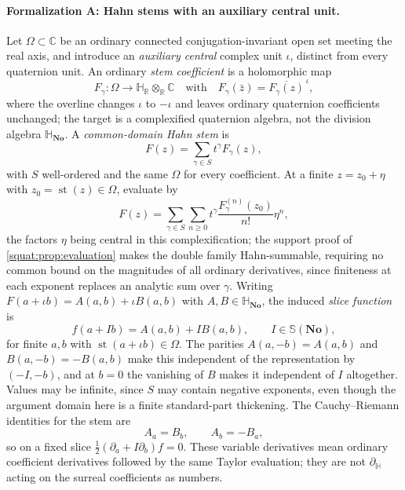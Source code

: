 \documentclass[11pt,letterpaper]{article}
\numberwithin{equation}{section}
\theoremstyle{definition}
\theoremstyle{remark}
\newcommand{\No}{\mathbf{No}}
\newcommand{\SQ}{\mathbb H_{\No}}
\newcommand{\HR}{\mathbb H_{\mathbb R}}
\newcommand{\R}{\mathbb R}
\newcommand{\C}{\mathbb C}
\newcommand{\st}{\operatorname{st}}
\newcommand{\dH}{\partial_{\mathbb H}}
\begin{document}
\paragraph{Formalization A: Hahn stems with an auxiliary central unit.}
Let $\Omega\subset\C$ be an ordinary connected conjugation-invariant open set meeting the
real axis, and introduce an \emph{auxiliary central} complex unit $\iota$, distinct from
every quaternion unit. An ordinary \emph{stem coefficient} is a holomorphic map
\[
 F_\gamma:\Omega\to\HR\otimes_\R\C\quad\text{with}\quad
 F_\gamma(\bar z)=\overline{F_\gamma(z)}^{\,\iota},
\]
where the overline changes $\iota$ to $-\iota$ and leaves ordinary quaternion coefficients
unchanged; the target is a complexified quaternion algebra, not the division algebra
$\SQ$. A \emph{common-domain Hahn stem} is
\begin{equation}\label{squat:eq:hahnstem}
 F(z)=\sum_{\gamma\in S}t^\gamma F_\gamma(z),
\end{equation}
with $S$ well-ordered and the same $\Omega$ for every coefficient. At a finite
$z=z_0+\eta$ with $z_0=\st(z)\in\Omega$, evaluate by
\begin{equation}\label{squat:eq:stemeval}
 F(z)=\sum_{\gamma\in S}\sum_{n\ge0}t^\gamma\frac{F_\gamma^{(n)}(z_0)}{n!}\eta^n,
\end{equation}
the factors $\eta$ being central in this complexification; the support proof of
\cref{squat:prop:evaluation} makes the double family Hahn-summable, requiring no common
bound on the magnitudes of all ordinary derivatives, since finiteness at each exponent
replaces an analytic sum over $\gamma$. Writing $F(a+\iota b)=A(a,b)+\iota B(a,b)$ with
$A,B\in\SQ$, the induced \emph{slice function} is
\begin{equation}\label{squat:eq:slicefunction}
 f(a+Ib)=A(a,b)+IB(a,b),\qquad I\in\mathbb S(\No),
\end{equation}
for finite $a,b$ with $\st(a+\iota b)\in\Omega$. The parities $A(a,-b)=A(a,b)$ and
$B(a,-b)=-B(a,b)$ make this independent of the representation by $(-I,-b)$, and at $b=0$
the vanishing of $B$ makes it independent of $I$ altogether. Values may be infinite, since
$S$ may contain negative exponents, even though the argument domain here is a finite
standard-part thickening. The Cauchy--Riemann identities for the stem are
\begin{equation}\label{squat:eq:CR}
 A_a=B_b,\qquad A_b=-B_a,
\end{equation}
so on a fixed slice $\tfrac12(\partial_a+I\partial_b)f=0$. These variable derivatives mean
ordinary coefficient derivatives followed by the same Taylor evaluation; they are not $\dH$
acting on the surreal coefficients as numbers.
\end{document}
